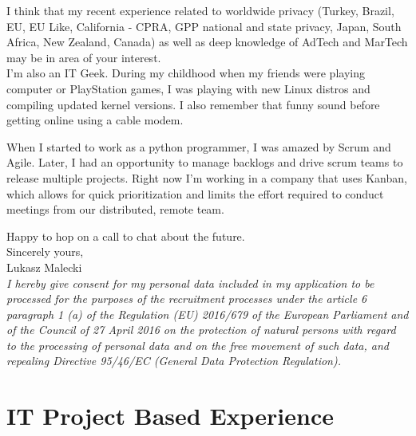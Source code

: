 \documentclass[11pt,a4paper,sans]{moderncv} %
\begin{document}
I think that my recent experience related to worldwide privacy (Turkey, Brazil, EU, EU Like, California - CPRA, GPP national and state privacy, Japan, South Africa, New Zealand, Canada) as well as deep knowledge of AdTech and MarTech may be in area of your interest. \\

I'm also an IT Geek. During my childhood when my friends were playing computer or PlayStation games, I was playing with new Linux distros and compiling updated kernel versions. I also remember that funny sound before getting online using a cable modem.

When I started to work as a python programmer, I was amazed by Scrum and Agile. Later, I had an opportunity to manage backlogs and drive scrum teams to release multiple projects. Right now I'm working in a company that uses Kanban, which allows for quick prioritization and limits the effort required to conduct meetings from our distributed, remote team.

Happy to hop on a call to chat about the future. \\
Sincerely yours, \\
Lukasz Malecki \\

\textit{I hereby give consent for my personal data included in my application to be processed for the purposes of the recruitment processes under the article 6 paragraph 1 (a) of the Regulation (EU) 2016/679 of the European Parliament and of the Council of 27 April 2016 on the protection of natural persons with regard to the processing of personal data and on the free movement of such data, and repealing Directive 95/46/EC (General Data Protection Regulation).}

\clearpage
\makecvtitle{}

\section{IT Project Based Experience}
\end{document}
